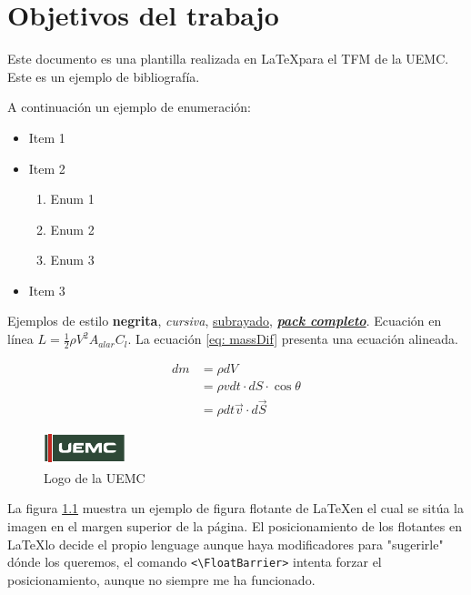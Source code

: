 \chapter{Objetivos del trabajo}
Este documento es una plantilla realizada en \LaTeX para el \gls{TFM} de la \gls{UEMC}. Este es un ejemplo de bibliografía\cite{Finazzi}.

A continuación un ejemplo de enumeración:
\begin{itemize}
	\item Item 1
	\item Item 2
	\begin{enumerate}
		\item Enum 1
		\item Enum 2
		\item Enum 3
	\end{enumerate}
	\item Item 3
\end{itemize}

Ejemplos de estilo \textbf{negrita}, \textit{cursiva}, \underline{subrayado}, \textbf{\textit{\underline{pack completo}}}. Ecuación en línea $L=\frac{1}{2}\rho V^2 A_{alar}C_l$. La ecuación \ref{eq: massDif} presenta una ecuación alineada.

\begin{align}
	\nonumber
	dm &= \rho dV \\ \nonumber
	   &= \rho v dt\cdot dS\cdot \cos{\theta}\\ \nonumber
	   &= \rho dt \overrightarrow{v}\cdot d\overrightarrow{S}
\end{align}\label{eq: massDif}

\begin{figure}[ht!]
	\centering
	\includegraphics[width=\columnwidth]{Logo/uemc_logo.pdf}      
	\caption{Logo de la \gls{UEMC}}
	\label{fig: UEMC_logo}
\end{figure}
La figura \ref{fig: UEMC_logo} muestra un ejemplo de figura flotante de \LaTeX en el cual se sitúa la imagen en el margen superior de la página. El posicionamiento de los flotantes en \LaTeX lo decide el propio lenguage aunque haya modificadores para "sugerirle" dónde los queremos, el comando \verb_<\FloatBarrier>_ intenta forzar el posicionamiento, aunque no siempre me ha funcionado.

